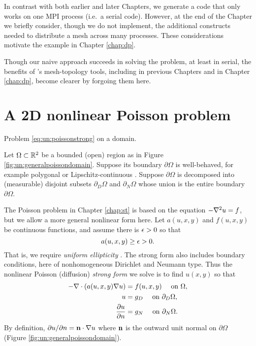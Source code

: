 In contrast with both earlier and later Chapters, we generate a code that only works on one MPI process (i.e.~a serial code).  However, at the end of the Chapter we briefly consider, though we do not implement, the additional constructs needed to distribute a mesh across many processes.  These considerations motivate the \pDMPlex example in Chapter \ref{chap:dp}.

Though our naive approach succeeds in solving the problem, at least in serial, the benefits of \PETSc's mesh-topology \pDM tools, including \pDMDA in previous Chapters and \pDMPlex in Chapter \ref{chap:dp}, become clearer by forgoing them here.


\section{A 2D nonlinear Poisson problem}

\begin{marginfigure}

\caption{Problem \eqref{eq:un:poissonstrong} on a domain.}
\label{fig:un:generalpoissondomain}
\end{marginfigure}

Let $\Omega \subset \mathbb{R}^2$ be a bounded (open) region as in Figure \ref{fig:un:generalpoissondomain}.  Suppose its boundary $\partial\Omega$ is well-behaved, for example polygonal or Lipschitz-continuous \citep[section 1.2]{Ciarlet2002}.  Suppose $\partial\Omega$ is decomposed into (measurable) disjoint subsets $\partial_D \Omega$ and $\partial_N \Omega$ whose union is the entire boundary $\partial \Omega$.

The Poisson problem in Chapter \ref{chap:st} is based on the equation $- \nabla^2 u = f$, but we allow a more general nonlinear form here.  Let $a(u,x,y)$ and $f(u,x,y)$ be continuous functions, and assume there is $\epsilon>0$ so that
    $$a(u,x,y) \ge \epsilon > 0.$$
That is, we require \emph{uniform ellipticity} \citep{Evans2010}.  The strong form also includes boundary conditions, here of nonhomogeneous Dirichlet and Neumann type.  Thus the  nonlinear Poisson (diffusion) \emph{strong form} we solve is to find $u(x,y)$ so that
\begin{align}
- \nabla\cdot \left(a(u,x,y) \nabla u\right) &= f(u,x,y) \quad \text{ on } \Omega, \label{eq:un:poissonstrong} \\
u &= g_D \quad \text{ on } \partial_D \Omega, \notag \\
\frac{\partial u}{\partial n} &= g_N \quad \text{ on } \partial_N \Omega. \notag
\end{align}
By definition, $\partial u/\partial n = \mathbf{n} \cdot \nabla u$ where $\mathbf{n}$ is the outward unit normal on $\partial \Omega$ (Figure \ref{fig:un:generalpoissondomain}).

